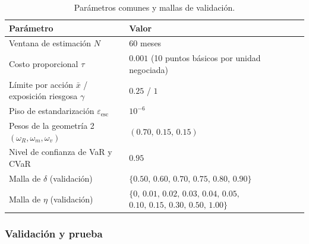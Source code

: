\begin{table}[h]
\centering
\caption{Parámetros comunes y mallas de validación.}\label{tab:param}
\begin{tabular}{|p{6.0cm}|p{9.0cm}|}
\hline
\textbf{Parámetro} & \textbf{Valor} \\ \hline
Ventana de estimación $N$ & 60 meses \\ \hline
Costo proporcional $\tau$ & $0.001$ (10 puntos básicos por unidad negociada) \\ \hline
Límite por acción $\bar x$ / exposición riesgosa $\gamma$ & $0.25$ / $1$ \\ \hline
Piso de estandarización $\varepsilon_{\mathrm{esc}}$ & $10^{-6}$ \\ \hline
Pesos de la geometría 2 $(\omega_R,\omega_m,\omega_v)$ & $(0.70,\,0.15,\,0.15)$ \\ \hline
Nivel de confianza de VaR y CVaR & $0.95$ \\ \hline
Malla de $\delta$ (validación) & $\{0.50,\,0.60,\,0.70,\,0.75,\,0.80,\,0.90\}$ \\ \hline

Malla de $\eta$ (validación) & $\{0,\,0.01,\,0.02,\,0.03,\,0.04,\,0.05,$\newline $0.10,\,0.15,\,0.30,\,0.50,\,1.00\}$ \\ \hline

\end{tabular}
\end{table}

\subsubsection{Validación y prueba}

